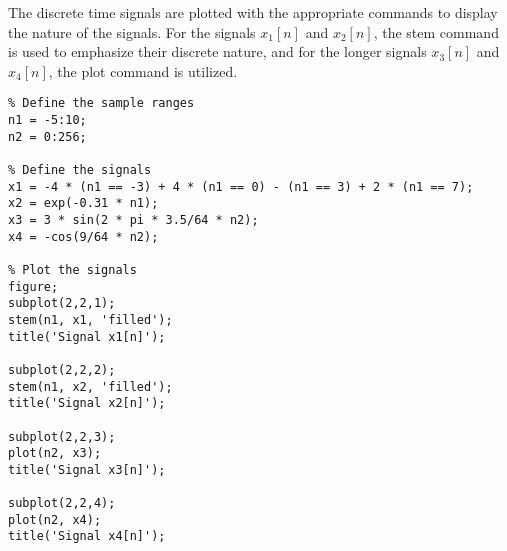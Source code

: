 
\item[(a)]
The discrete time signals are plotted with the appropriate commands to display the nature of the signals.
For the signals $x_{1}[n]$ and $x_{2}[n]$, the stem command is used to emphasize their discrete nature,
and for the longer signals $x_{3}[n]$ and $x_{4}[n]$, the plot command is utilized.

\begin{verbatim}
% Define the sample ranges
n1 = -5:10;
n2 = 0:256;

% Define the signals
x1 = -4 * (n1 == -3) + 4 * (n1 == 0) - (n1 == 3) + 2 * (n1 == 7);
x2 = exp(-0.31 * n1);
x3 = 3 * sin(2 * pi * 3.5/64 * n2);
x4 = -cos(9/64 * n2);

% Plot the signals
figure;
subplot(2,2,1);
stem(n1, x1, 'filled');
title('Signal x1[n]');

subplot(2,2,2);
stem(n1, x2, 'filled');
title('Signal x2[n]');

subplot(2,2,3);
plot(n2, x3);
title('Signal x3[n]');

subplot(2,2,4);
plot(n2, x4);
title('Signal x4[n]');
\end{verbatim}
